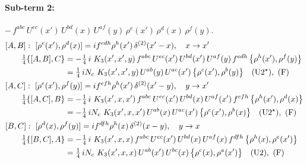 \documentclass[10pt]{article}
\numberwithin{equation}{section}
\begin{document}
\paragraph{Sub-term 2:} $-\,f^{abc}\,U^{ec}(x')\,U^{bd}(x)\,U^{af}(y)\,\rho^{e}(x')\,\rho^{d}(x)\,\rho^{f}(y)$.
\begin{align}
&[A,B]:\ [\rho^{e}(x'),\rho^{d}(x)]=i f^{edh}\rho^{h}(x')\,\delta^{(2)}(x'-x),\quad x\to x'\notag\\
&\qquad \tfrac14\{[A,B],C\}=-\tfrac14\,i\,\,K_3(x',x',y)\,f^{abc}\,U^{ec}(x')\,U^{bd}(x')\,U^{af}(y)\,f^{edh}\,\big\{\rho^{h}(x'),\rho^{f}(y)\big\}\notag\\
&\qquad\phantom{\tfrac14\{[A,B],C\}}=\tfrac14\,i N_{c}\,\,K_3(x',x',y)\,U^{ab}(y)\,U^{ac}(x')\,\big\{\rho^{c}(x'),\rho^{b}(y)\big\}\quad\text{(U2$^\star$)},\ \text{(F)}
\label{R:eq:B2-2-AB}\\
&[A,C]:\ [\rho^{e}(x'),\rho^{f}(y)]=i f^{efh}\rho^{h}(x')\,\delta^{(2)}(x'-y),\quad y\to x'\notag\\
&\qquad \tfrac14\{[A,C],B\}=-\tfrac14\,i\,\,K_3(x',x,x')\,f^{abc}\,U^{ec}(x')\,U^{bd}(x)\,U^{af}(x')\,f^{efh}\,\big\{\rho^{h}(x'),\rho^{d}(x)\big\}\notag\\
&\qquad\phantom{\tfrac14\{[A,C],B\}}=-\tfrac14\,i N_{c}\,\,K_3(x',x,x')\,U^{ab}(x)\,U^{ac}(x')\,\big\{\rho^{c}(x'),\rho^{b}(x)\big\}\quad\text{(U2$^\star$)},\ \text{(F)}
\label{R:eq:B2-2-AC}\\
&[B,C]:\ [\rho^{d}(x),\rho^{f}(y)]=i f^{dfh}\rho^{h}(x)\,\delta^{(2)}(x-y),\quad y\to x\notag\\
&\qquad \tfrac14\{[B,C],A\}=-\tfrac14\,i\,\,K_3(x',x,x)\,f^{abc}\,U^{ec}(x')\,U^{bd}(x)\,U^{af}(x)\,f^{dfh}\,\big\{\rho^{h}(x),\rho^{e}(x')\big\}\notag\\
&\qquad\phantom{\tfrac14\{[B,C],A\}}=\tfrac14\,i N_{c}\,\,K_3(x',x,x)\,U^{ab}(x')\,U^{bc}(x)\,\big\{\rho^{c}(x),\rho^{a}(x')\big\}\quad\text{(U2)},\ \text{(F)}
\label{R:eq:B2-2-BC}
\end{align}
\end{document}

